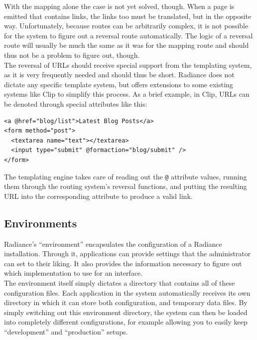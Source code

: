 \documentclass{sig-alternate}
\begin{document}
With the mapping alone the case is not yet solved, though. When a page is emitted that contains links, the links too must be translated, but in the opposite way. Unfortunately, because routes can be arbitrarily complex, it is not possible for the system to figure out a reversal route automatically. The logic of a reversal route will usually be much the same as it was for the mapping route and should thus not be a problem to figure out, though. \\

The reversal of URLs should receive special support from the templating system, as it is very frequently needed and should thus be short. Radiance does not dictate any specific template system, but offers extensions to some existing systems like Clip\cite{clip} to simplify this process. As a brief example, in Clip, URLs can be denoted through special attributes like this:

\begin{verbatim}
<a @href="blog/list">Latest Blog Posts</a>
<form method="post">
  <textarea name="text"></textarea>
  <input type="submit" @formaction="blog/submit" />
</form>
\end{verbatim}

The templating engine takes care of reading out the \texttt{@} attribute values, running them through the routing system's reversal functions, and putting the resulting URL into the corresponding attribute to produce a valid link.

\subsection{Environments}
Radiance's ``environment'' encapsulates the configuration of a Radiance installation. Through it, applications can provide settings that the administrator can set to their liking. It also provides the information necessary to figure out which implementation to use for an interface. \\

The environment itself simply dictates a directory that contains all of these configuration files. Each application in the system automatically receives its own directory in which it can store both configuration, and temporary data files. By simply switching out this environment directory, the system can then be loaded into completely different configurations, for example allowing you to easily keep ``development'' and ``production'' setups. \\
\end{document}
